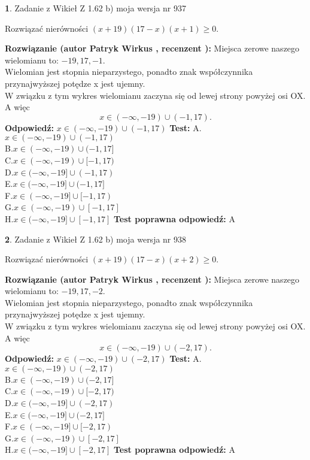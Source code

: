 \documentclass[12pt, a4paper]{article}
\theoremstyle{definition} %
\newtheorem{zad}{}
\newcommand{\zadStart}[1]{\begin{zad}#1\newline}
\newcommand{\zadStop}{\end{zad}}
\newcommand{\rozwStart}[2]{\noindent \textbf{Rozwiązanie (autor #1 , recenzent #2): }\newline}
\newcommand{\rozwStop}{\newline}
\newcommand{\odpStart}{\noindent \textbf{Odpowiedź:}\newline}
\newcommand{\odpStop}{\newline}
\newcommand{\testStart}{\noindent \textbf{Test:}\newline}
\newcommand{\testStop}{\newline}
\newcommand{\kluczStart}{\noindent \textbf{Test poprawna odpowiedź:}\newline}
\newcommand{\kluczStop}{\newline}
\begin{document}
\zadStart{Zadanie z Wikieł Z 1.62 b) moja wersja nr 937}

Rozwiązać nierówności $(x+19)(17-x)(x+1)\ge0$.
\zadStop
\rozwStart{Patryk Wirkus}{}
Miejsca zerowe naszego wielomianu to: $-19, 17, -1$.\\
Wielomian jest stopnia nieparzystego, ponadto znak współczynnika przy\linebreak najwyższej potędze x jest ujemny.\\ W związku z tym wykres wielomianu zaczyna się od lewej strony powyżej osi OX. A więc $$x \in (-\infty,-19) \cup (-1,17).$$
\rozwStop
\odpStart
$x \in (-\infty,-19) \cup (-1,17)$
\odpStop
\testStart
A.$x \in (-\infty,-19) \cup (-1,17)$\\
B.$x \in (-\infty,-19) \cup (-1,17]$\\
C.$x \in (-\infty,-19) \cup [-1,17)$\\
D.$x \in (-\infty,-19] \cup (-1,17)$\\
E.$x \in (-\infty,-19] \cup (-1,17]$\\
F.$x \in (-\infty,-19] \cup [-1,17)$\\
G.$x \in (-\infty,-19) \cup [-1,17]$\\
H.$x \in (-\infty,-19] \cup [-1,17]$
\testStop
\kluczStart
A
\kluczStop



\zadStart{Zadanie z Wikieł Z 1.62 b) moja wersja nr 938}

Rozwiązać nierówności $(x+19)(17-x)(x+2)\ge0$.
\zadStop
\rozwStart{Patryk Wirkus}{}
Miejsca zerowe naszego wielomianu to: $-19, 17, -2$.\\
Wielomian jest stopnia nieparzystego, ponadto znak współczynnika przy\linebreak najwyższej potędze x jest ujemny.\\ W związku z tym wykres wielomianu zaczyna się od lewej strony powyżej osi OX. A więc $$x \in (-\infty,-19) \cup (-2,17).$$
\rozwStop
\odpStart
$x \in (-\infty,-19) \cup (-2,17)$
\odpStop
\testStart
A.$x \in (-\infty,-19) \cup (-2,17)$\\
B.$x \in (-\infty,-19) \cup (-2,17]$\\
C.$x \in (-\infty,-19) \cup [-2,17)$\\
D.$x \in (-\infty,-19] \cup (-2,17)$\\
E.$x \in (-\infty,-19] \cup (-2,17]$\\
F.$x \in (-\infty,-19] \cup [-2,17)$\\
G.$x \in (-\infty,-19) \cup [-2,17]$\\
H.$x \in (-\infty,-19] \cup [-2,17]$
\testStop
\kluczStart
A
\kluczStop
\end{document}
